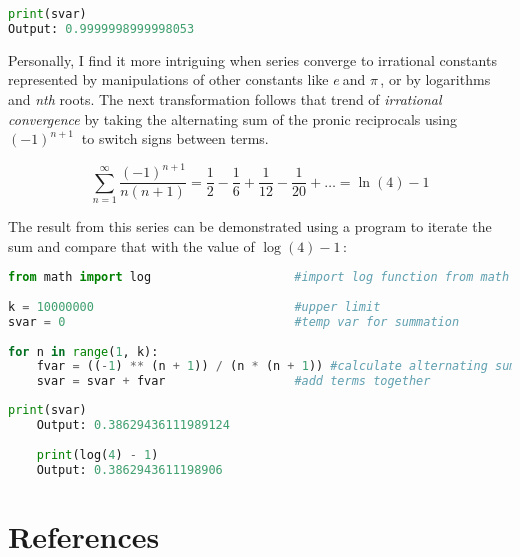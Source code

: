 \documentclass[12]{article}
\begin{document}
\begin{lstlisting}[style=mycodestyle, language=Python]
print(svar)
Output: 0.9999998999998053
\end{lstlisting}

Personally, I find it more intriguing when series converge to irrational constants represented by manipulations of other constants like $ e\ $and $ \pi\,$, or by logarithms and \textit{nth} roots. The next transformation follows that trend of \textit{irrational convergence} by taking the alternating sum of the pronic reciprocals using $ (-1)^{n+1}\ $ to switch signs between terms.

\begin{equation*}
	\sum_{n = 1}^{\infty}\frac{(-1)^{n+1}}{n(n+1)} = \frac{1}{2} - \frac{1}{6} + \frac{1}{12} - \frac{1}{20} + \dots = \ln(4) - 1
\end{equation*}

The result from this series can be demonstrated using a program to iterate the sum and compare that with the value of $ \log(4) - 1\,$:

\begin{lstlisting}[style=mycodestyle, language=Python]
from math import log                    #import log function from math module
	
k = 10000000                            #upper limit
svar = 0                                #temp var for summation
	
for n in range(1, k):
	fvar = ((-1) ** (n + 1)) / (n * (n + 1)) #calculate alternating sum
	svar = svar + fvar                  #add terms together
\end{lstlisting}

\begin{lstlisting}[style=mycodestyle, language=Python]
	print(svar)
	Output: 0.38629436111989124
	
	print(log(4) - 1)
	Output: 0.3862943611198906
\end{lstlisting}

\section*{References}
\end{document}
